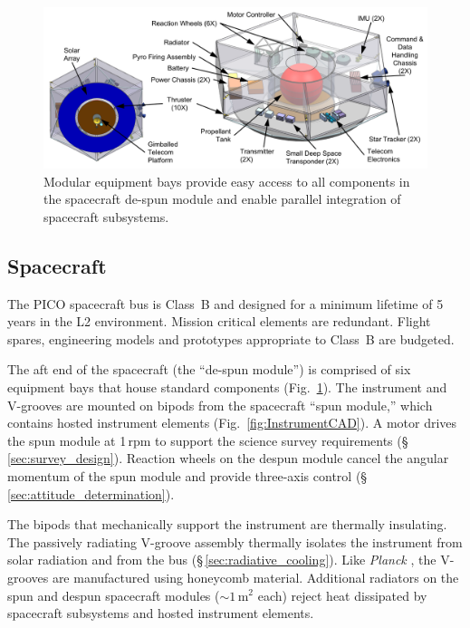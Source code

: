 \begin{figure}
\begin{center}
\includegraphics[width=\textwidth]{figures/Spacecraft.png}
\caption{\captiontext
  Modular equipment bays provide easy access to all components
  in the spacecraft de-spun module and enable parallel integration of
  spacecraft subsystems.\label{fig:Spacecraft}}
\end{center}
\end{figure}

\subsection{Spacecraft}
\label{sec:spacecraft} %

The PICO spacecraft bus is Class~B and designed for a minimum lifetime of 5\,years in the L2
environment. Mission critical elements are redundant. Flight spares,
engineering models and prototypes appropriate to Class~B are budgeted.

The aft end of the spacecraft (the ``de-spun module'') is comprised of
six equipment bays that house standard components
(Fig.~\ref{fig:Spacecraft}).  The instrument and V-grooves are mounted on
bipods from the spacecraft ``spun module,'' which contains hosted
instrument elements (Fig.~\ref{fig:InstrumentCAD}). A motor drives the
spun module at 1\,rpm to support the science survey requirements
(\S\,\ref{sec:survey_design}). Reaction wheels on the despun module
cancel the angular momentum of the spun module and provide three-axis
control (\S\,\ref{sec:attitude_determination}).

The bipods that mechanically support the instrument are thermally
insulating. The passively radiating V-groove assembly thermally
isolates the instrument from solar radiation and from the bus
(\S\,\ref{sec:radiative_cooling}). Like \textit{Planck} \citep{Tauber2010}, the V-grooves are
manufactured using honeycomb material. Additional radiators on the
spun and despun spacecraft modules ($\sim1$\,m$^2$ each) reject heat
dissipated by spacecraft subsystems and hosted instrument elements.

